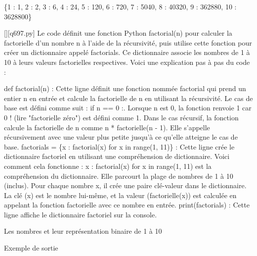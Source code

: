\{1 : 1, 2 : 2, 3 : 6, 4 : 24, 5 : 120, 6 : 720, 7 : 5040, 8 : 40320, 9 : 362880, 10 : 3628800\}
        \par
        \begin{solution}
            \renewcommand{\nomfichier}{q697.py}
            \pythonfile{\chemincode \nomfichier}[][\nomfichier]
            Le code définit une fonction Python factorial(n) pour calculer la factorielle d'un nombre n à l'aide de la récursivité, puis utilise cette fonction pour créer un dictionnaire appelé factorials. Ce dictionnaire associe les nombres de 1 à 10 à leurs valeurs factorielles respectives. Voici une explication pas à pas du code :

    def factorial(n) : Cette ligne définit une fonction nommée factorial qui prend un entier n en entrée et calcule la factorielle de n en utilisant la récursivité.
        Le cas de base est défini comme suit : if n == 0 :. Lorsque n est 0, la fonction renvoie 1 car 0 ! (lire "factorielle zéro") est défini comme 1.
        Dans le cas récursif, la fonction calcule la factorielle de n comme n * factorielle(n - 1). Elle s'appelle récursivement avec une valeur plus petite jusqu'à ce qu'elle atteigne le cas de base.
    factorials = \{x : factorial(x) for x in range(1, 11)\} : Cette ligne crée le dictionnaire factoriel en utilisant une compréhension de dictionnaire. Voici comment cela fonctionne :
        {x : factorial(x) for x in range(1, 11)} est la compréhension du dictionnaire. Elle parcourt la plage de nombres de 1 à 10 (inclus).
        Pour chaque nombre x, il crée une paire clé-valeur dans le dictionnaire. La clé (x) est le nombre lui-même, et la valeur (factorielle(x)) est calculée en appelant la fonction factorielle avec ce nombre en entrée.
    print(factorials) : Cette ligne affiche le dictionnaire factoriel sur la console.
        \end{solution}
        

        \question
        Les nombres et leur représentation binaire de 1 à 10

Exemple de sortie

